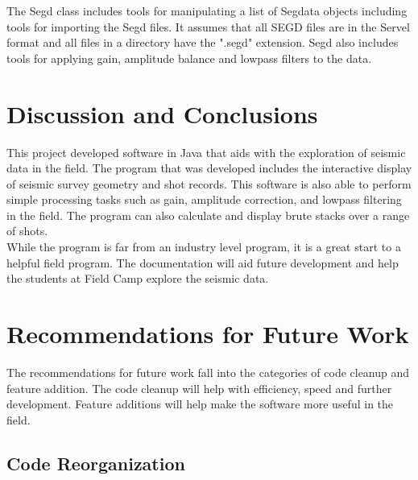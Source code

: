 \documentclass[12pt]{article}
\begin{document}
The Segd class includes tools for manipulating a list of Segdata objects including tools for importing the Segd files. It assumes that all SEGD files are in the Servel format and all files in a directory have the ".segd" extension. Segd also includes tools for applying gain, amplitude balance and lowpass filters to the data. 

\section{Discussion and Conclusions}

This project developed software in Java that aids with the exploration of seismic data in the field. The program that was developed includes the interactive display of seismic survey geometry and shot records. This software is also able to perform simple processing tasks such as gain, amplitude correction, and lowpass filtering in the field. The program can also calculate and display brute stacks over a range of shots.  \\ 

While the program is far from an industry level program, it is a great start to a helpful field program. The documentation will aid future development and help the students at Field Camp explore the seismic data.

\section{Recommendations for Future Work}

The recommendations for future work fall into the categories of code cleanup and feature addition. The code cleanup will help with efficiency, speed and further development. Feature additions will help make the software more useful in the field. 

\subsection{Code Reorganization}
\end{document}
